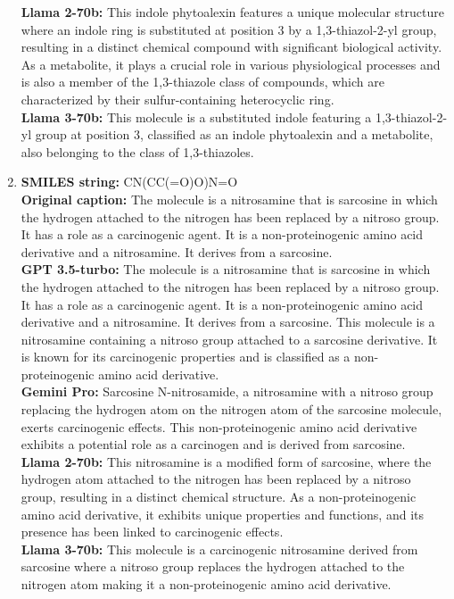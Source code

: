 \begin{enumerate}[leftmargin=*]
    \textbf{Llama 2-70b:} This indole phytoalexin features a unique molecular structure where an indole ring is substituted at position 3 by a 1,3-thiazol-2-yl group, resulting in a distinct chemical compound with significant biological activity. As a metabolite, it plays a crucial role in various physiological processes and is also a member of the 1,3-thiazole class of compounds, which are characterized by their sulfur-containing heterocyclic ring. \\
    \textbf{Llama 3-70b:} This molecule is a substituted indole featuring a 1,3-thiazol-2-yl group at position 3, classified as an indole phytoalexin and a metabolite, also belonging to the class of 1,3-thiazoles. \\
    \item 
    \textbf{SMILES string:} CN(CC(=O)O)N=O \\
    \textbf{Original caption:} The molecule is a nitrosamine that is sarcosine in which the hydrogen attached to the nitrogen has been replaced by a nitroso group. It has a role as a carcinogenic agent. It is a non-proteinogenic amino acid derivative and a nitrosamine. It derives from a sarcosine. \\
    \textbf{GPT 3.5-turbo:} The molecule is a nitrosamine that is sarcosine in which the hydrogen attached to the nitrogen has been replaced by a nitroso group. It has a role as a carcinogenic agent. It is a non-proteinogenic amino acid derivative and a nitrosamine. It derives from a sarcosine.	This molecule is a nitrosamine containing a nitroso group attached to a sarcosine derivative. It is known for its carcinogenic properties and is classified as a non-proteinogenic amino acid derivative. \\
    \textbf{Gemini Pro:} Sarcosine N-nitrosamide, a nitrosamine with a nitroso group replacing the hydrogen atom on the nitrogen atom of the sarcosine molecule, exerts carcinogenic effects. This non-proteinogenic amino acid derivative exhibits a potential role as a carcinogen and is derived from sarcosine. \\
    \textbf{Llama 2-70b:} This nitrosamine is a modified form of sarcosine, where the hydrogen atom attached to the nitrogen has been replaced by a nitroso group, resulting in a distinct chemical structure. As a non-proteinogenic amino acid derivative, it exhibits unique properties and functions, and its presence has been linked to carcinogenic effects. \\
    \textbf{Llama 3-70b:} This molecule is a carcinogenic nitrosamine derived from sarcosine where a nitroso group replaces the hydrogen attached to the nitrogen atom making it a non-proteinogenic amino acid derivative. \\

\end{enumerate}
